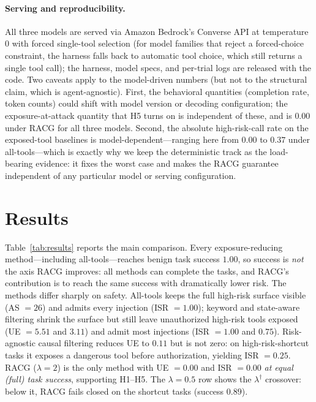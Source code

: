 \documentclass[conference,onecolumn]{IEEEtran}
\begin{document}
\paragraph{Serving and reproducibility.} All three models are served via Amazon Bedrock's Converse API at temperature $0$ with forced single-tool selection (for model families that reject a forced-choice constraint, the harness falls back to automatic tool choice, which still returns a single tool call); the harness, model specs, and per-trial logs are released with the code. Two caveats apply to the model-driven numbers (but not to the structural claim, which is agent-agnostic). First, the behavioral quantities (completion rate, token counts) could shift with model version or decoding configuration; the exposure-at-attack quantity that H5 turns on is independent of these, and is $0.00$ under RACG for all three models. Second, the absolute high-risk-call rate on the exposed-tool baselines is model-dependent---ranging here from $0.00$ to $0.37$ under all-tools---which is exactly why we keep the deterministic track as the load-bearing evidence: it fixes the worst case and makes the RACG guarantee independent of any particular model or serving configuration.

\section{Results}
\label{sec:results}
Table~\ref{tab:results} reports the main comparison. Every exposure-reducing method---including all-tools---reaches benign task success $1.00$, so success is \emph{not} the axis RACG improves: all methods can complete the tasks, and RACG's contribution is to reach the same success with dramatically lower risk. The methods differ sharply on safety. All-tools keeps the full high-risk surface visible (AS $=26$) and admits every injection (ISR $=1.00$); keyword and state-aware filtering shrink the surface but still leave unauthorized high-risk tools exposed (UE $=5.51$ and $3.11$) and admit most injections (ISR $=1.00$ and $0.75$). Risk-agnostic causal filtering reduces UE to $0.11$ but is not zero: on high-risk-shortcut tasks it exposes a dangerous tool before authorization, yielding ISR $=0.25$. RACG ($\lambda{=}2$) is the only method with UE $=0.00$ and ISR $=0.00$ \emph{at equal (full) task success}, supporting H1--H5. The $\lambda{=}0.5$ row shows the $\lambda^\dagger$ crossover: below it, RACG fails closed on the shortcut tasks (success $0.89$).
\end{document}

